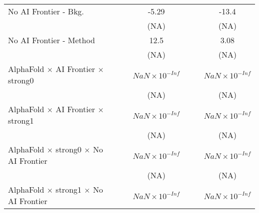 \begin{tabular}{lcccccc}
   No AI Frontier - Bkg.                                                      &                        &       & -5.29                  &                        &                        & -13.4\\   
                                                                              &                        &       & (NA)                   &                        &                        & (NA)\\   
   No AI Frontier - Method                                                    &                        &       & 12.5                   &                        &                        & 3.08\\   
                                                                              &                        &       & (NA)                   &                        &                        & (NA)\\   
   AlphaFold $\times$ AI Frontier $\times$ strong0                            &                        &       & $NaN\times 10^{-Inf}$  &                        &                        & $NaN\times 10^{-Inf}$\\    
                                                                              &                        &       & (NA)                   &                        &                        & (NA)\\   
   AlphaFold $\times$ AI Frontier $\times$ strong1                            &                        &       & $NaN\times 10^{-Inf}$  &                        &                        & $NaN\times 10^{-Inf}$\\    
                                                                              &                        &       & (NA)                   &                        &                        & (NA)\\   
   AlphaFold $\times$ strong0 $\times$ No AI Frontier                         &                        &       & $NaN\times 10^{-Inf}$  &                        &                        & $NaN\times 10^{-Inf}$\\    
                                                                              &                        &       & (NA)                   &                        &                        & (NA)\\   
   AlphaFold $\times$ strong1 $\times$ No AI Frontier                         &                        &       & $NaN\times 10^{-Inf}$  &                        &                        & $NaN\times 10^{-Inf}$\\    

\end{tabular}
